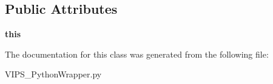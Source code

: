 \subsection*{Public Attributes}
\begin{DoxyCompactItemize}
\item 
{\bfseries this}\hypertarget{classVIPS__PythonWrapper_1_1VIPS__PythonWrapper_adb6e9e15a74ffe66a7b6442cead1bf25}{}\label{classVIPS__PythonWrapper_1_1VIPS__PythonWrapper_adb6e9e15a74ffe66a7b6442cead1bf25}

\end{DoxyCompactItemize}


The documentation for this class was generated from the following file\+:\begin{DoxyCompactItemize}
\item 
V\+I\+P\+S\+\_\+\+Python\+Wrapper.\+py\end{DoxyCompactItemize}
